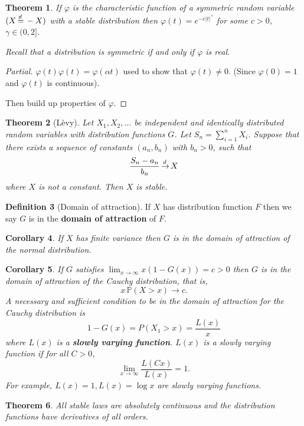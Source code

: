 \documentclass[10pt, oneside, reqno]{amsart}
\theoremstyle{plain}%
\newtheorem{thm}{Theorem}[section]
\newtheorem{cor}[thm]{Corollary}
\theoremstyle{definition}
\newtheorem{defn}[thm]{Definition}
\theoremstyle{remark}
\renewcommand{\phi}{\varphi}
\renewcommand{\P}{\mathbb{P}}
\def\cid{\,{\buildrel \!d \over \rightarrow}\,}
\def\eqd{\,{\buildrel \!d \over =}\,}
\begin{document}
\begin{thm}
	If $\phi$ is the characteristic function of a symmetric random variable $(X \eqd -X)$ with a stable distribution then $\phi(t) = e^{-c|t|^\gamma}$ for some $c > 0$, $\gamma \in (0, 2]$.  
	
	Recall that a distribution is symmetric if and only if $\phi$ is real.
\end{thm}
\begin{proof}[Partial]
	$\phi(t) \phi(t) = \phi(\alpha t)$ used to show that $\phi(t) \neq 0$.  (Since $\phi(0) = 1$ and $\phi(t)$ is continuous).
	
	Then build up properties of $\phi$.
\end{proof}

\begin{thm}[L\`evy]
	Let $X_1, X_2, \dots$ be independent and identically distributed random variables with distribution functions $G$.  Let $S_n = \sum_{i = 1}^n X_i$.  
	Suppose that there exists a sequence of constants $(a_n, b_n)$ with $b_n > 0$, such that \[
		\frac{S_n - a_n}{b_n} \cid X
	\] where $X$ is not a constant.   Then $X$ is stable.
\end{thm}

\begin{defn}[Domain of attraction]
	If $X$ has distribution function $F$ then we say $G$ is in the \textbf{domain of attraction} of $F$.    
\end{defn}
\begin{cor}
	If $X$ has finite variance then $G$ is in the domain of attraction of the normal distribution.  
\end{cor}

\begin{cor}
	If $G$ satisfies $\lim_{x \rightarrow \infty} x(1 - G(x)) = c > 0$ then $G$ is in the domain of attraction of the Cauchy distribution, that is, \[
		x\,\P(X > x) \rightarrow c.
	\]  A necessary and sufficient condition to be in the domain of attraction for the Cauchy distribution is \[
		1 - G(x) = P(X_1 > x) = \frac{L(x)}{x}
	\] where $L(x)$ is a \textbf{slowly varying function}.  $L(x)$ is a slowly varying function if for all $C > 0$, \[
		\lim_{x \rightarrow \infty} \frac{L(C x)}{L(x)} = 1.
	\]  For example, $L(x) = 1, L(x) = \log x$ are slowly varying functions.
\end{cor}

\begin{thm}
	All stable laws are absolutely continuous and the distribution functions have derivatives of all orders.
\end{thm}
\end{document}
